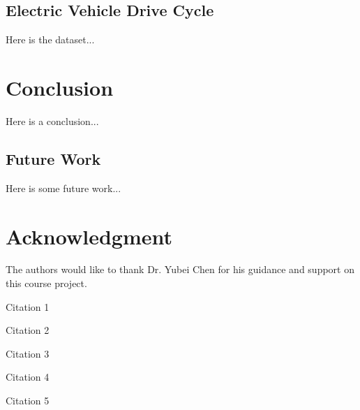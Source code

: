 \documentclass[conference]{IEEEtran}
\begin{document}
\subsection{Electric Vehicle Drive Cycle}
Here is the dataset...


\section{Conclusion}%
Here is a conclusion...

\subsection{Future Work}
Here is some future work...

\section*{Acknowledgment}
The authors would like to thank Dr. Yubei Chen for his guidance and support on this course project.

\begin{thebibliography}{1}


Citation 1

Citation 2

Citation 3

Citation 4

Citation 5

\end{thebibliography}
\end{document}
